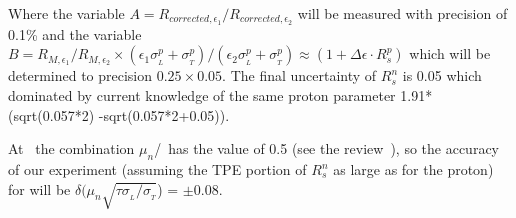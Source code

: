 Where the variable $A = R_{{corrected},\epsilon_1}/R_{{corrected},\epsilon_2}$ will be measured with precision of 0.1\% and the variable 
\mbox{$ B = {R_{M,\epsilon_1}}/{R_{M,\epsilon_2}} \times (\epsilon_1 \sigma_{_L}^p + \sigma_{_T}^p)/(\epsilon_2 \sigma_{_L}^p + \sigma_{_T}^p) \approx (1 + \Delta \epsilon \cdot R_s^p) $}
which will be determined to precision $0.25 \times 0.05$.
The final uncertainty of $R_s^n$ is 0.05 which dominated by current knowledge of the same proton parameter 1.91*(sqrt(0.057*2) -sqrt(0.057*2+0.05)).
 
At  \gevcsq~the combination $\mu_n$\gen/\gmn~has the value of 0.5 (see the review~\cite{Punjabi:2015bba}), 
so the accuracy of our experiment (assuming the TPE portion of $R_s^n$ as large as for the proton) for will be $\delta (\mu_n \sqrt{ \tau \sigma_{_L}/\sigma{_{_T}}}$) = $\pm$0.08. 



